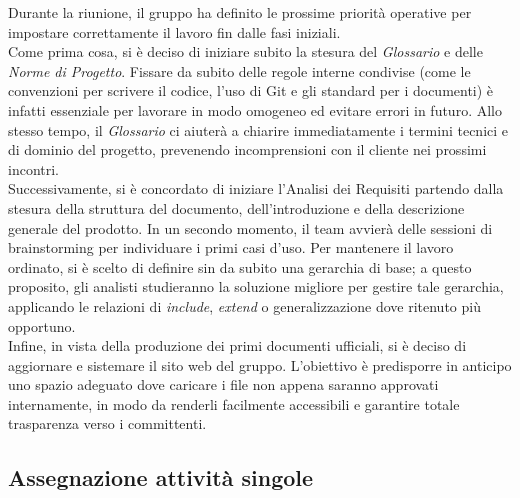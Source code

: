 \documentclass[a4paper, 10pt, colorlinks=true, linkcolor=black, urlcolor=blue, citecolor=blue, hidelinks]{article}
\begin{document}
Durante la riunione, il gruppo ha definito le prossime priorità operative per impostare correttamente il lavoro fin dalle fasi iniziali. \\
Come prima cosa, si è deciso di iniziare subito la stesura del \textit{Glossario} e delle \textit{Norme di Progetto}. Fissare da subito delle regole interne condivise (come le convenzioni per scrivere il codice, l'uso di Git e gli standard per i documenti) è infatti essenziale per lavorare in modo omogeneo ed evitare errori in futuro. Allo stesso tempo, il \textit{Glossario} ci aiuterà a chiarire immediatamente i termini tecnici e di dominio del progetto, prevenendo incomprensioni con il cliente nei prossimi incontri.\\
Successivamente, si è concordato di iniziare l'Analisi dei Requisiti partendo dalla stesura della struttura del documento, dell'introduzione e della descrizione generale del prodotto. In un secondo momento, il team avvierà delle sessioni di brainstorming per individuare i primi casi d'uso. Per mantenere il lavoro ordinato, si è scelto di definire sin da subito una gerarchia di base; a questo proposito, gli analisti studieranno la soluzione migliore per gestire tale gerarchia, applicando le relazioni di \textit{include}, \textit{extend} o generalizzazione dove ritenuto più opportuno.\\
Infine, in vista della produzione dei primi documenti ufficiali, si è deciso di aggiornare e sistemare il sito web del gruppo. L'obiettivo è predisporre in anticipo uno spazio adeguato dove caricare i file non appena saranno approvati internamente, in modo da renderli facilmente accessibili e garantire totale trasparenza verso i committenti.

\subsection{Assegnazione attività singole}
\end{document}
